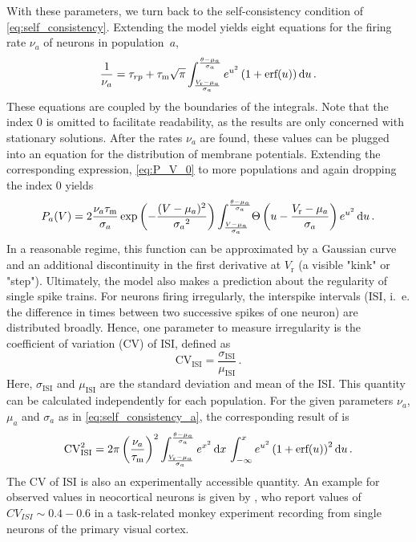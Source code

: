 With these parameters, we turn back to the self-consistency condition 
of \autoref{eq:self_consistency}. Extending the model yields eight equations for the 
firing rate $\nu_a$ of neurons in population~$a$, 
\begin{equation}
    \frac{1}{\nu_{a}} = \tau_{rp} 
        + \tau_\text{m} \sqrt{\pi}
            \int_{\frac{V_\text{r} - \mu_{a}}{\sigma_{a}}}^{\frac{\theta - \mu_{a}}{\sigma_{a}}} 
                e^{u^2} \left(1 + \text{erf}(u)\right) \mathop{}\!\text{d} u  \,.
    \label{eq:self_consistency_a}
\end{equation}
These equations are coupled by the boundaries of the integrals. Note that the index $0$ 
is omitted to facilitate readability, as the results are only concerned with stationary
solutions. After the rates $\nu_a$ are found, these values can be 
plugged into an equation for the distribution of membrane potentials. Extending the 
corresponding expression, \autoref{eq:P_V_0} to more populations and again dropping the 
index $0$ yields
\begin{equation}
    P_a(V) = 2 \frac{\nu_a \tau_\text{m}}{\sigma_a} 
        \exp{\left(- \frac{(V - \mu_a)^2}{{\sigma_a}^2} \right)}
        \int_{\frac{V - \mu_a}{\sigma_a}}^{\frac{\theta - \mu_a}{\sigma_a}} \! 
            \Theta \left(u - \frac{V_\text{r} - \mu_a}{\sigma_a} \right) e^{u^2} \mathop{}\!\text{d} u  \,.
    \label{eq:P_V_a}
\end{equation}
In a reasonable regime, this function can be approximated by a Gaussian curve and an 
additional discontinuity in the first 
derivative at $V_\text{r}$ (a visible "kink" or "step").
Ultimately, the model also makes a prediction about the regularity of single spike 
trains. For neurons firing irregularly, the interspike intervals
(ISI, i.~e. the difference in times between two successive spikes of one neuron) 
are distributed broadly. Hence, one parameter to measure irregularity is the coefficient 
of variation (CV) of ISI, defined as
\begin{equation}
    \text{CV}_\text{ISI} = \frac{\sigma_\text{ISI}}{\mu_\text{ISI}} \,.
    \label{eq:cv_isi}
\end{equation}
Here, $\sigma_\text{ISI}$ and $\mu_\text{ISI}$ are the standard deviation and mean of 
the ISI. This quantity can be calculated
independently for each population. For the given parameters $\nu_a$, $\mu_a$ and 
$\sigma_a$ as in \autoref{eq:self_consistency_a}, the corresponding 
result of  is
\begin{equation}
    \text{CV}_\text{ISI}^2 
        = 2 \pi \left(\frac{\nu_a}{\tau_\text{m}}\right)^2
            \int_{\frac{V_\text{r} - \mu_{a}}{\sigma_{a}}}^{\frac{\theta - \mu_{a}}{\sigma_{a}}} 
            e^{x^2}  \,\text{d}x  \,
            \int_{-\infty}^{x} 
            e^{u^2} \left(1 + \text{erf}(u)\right)^2 \mathop{}\!\text{d} u  \,.
    \label{eq:CV_ISI_mf}
\end{equation}
The CV of ISI is also an experimentally accessible quantity. An example for observed 
values in neocortical neurons is given by , who report values
of $CV_{ISI} \sim 0.4 - 0.6$ in a task-related monkey experiment recording from 
single neurons of the primary visual cortex.

